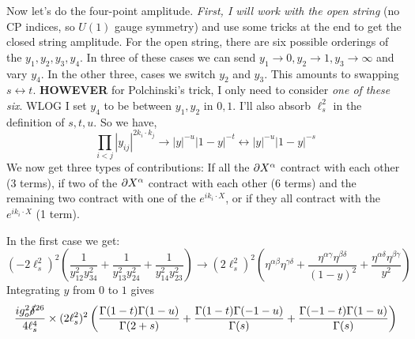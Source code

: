 \documentclass[11pt, class=article, crop=false]{standalone}
\begin{document}
\begin{enumerate}
	Now let's do the four-point amplitude. \emph{First, I will work with the open string} (no CP indices, so $U(1)$ gauge symmetry) and use some tricks at the end to get the closed string amplitude. For the open string, there are six possible orderings of the $y_1, y_2, y_3, y_4$. In three of these cases we can send $y_1\to 0, y_2 \to 1, y_3 \to \infty$ and vary $y_4$. In the other three, cases we switch $y_2$ and $y_3$. This amounts to swapping $s\leftrightarrow t$. \textbf{HOWEVER} for Polchinski's trick, I only need to consider \emph{one of these six}. WLOG I set $y_4$ to be between $y_1, y_2$ in $0,1$.
	I'll also absorb $\ell_s^2$ in the definition of $s,t,u$. So we have,
	\[
		\prod_{i<j} |y_{ij}|^{2 k_i \cdot k_j} \to |y|^{-u} |1-y|^{-t} \leftrightarrow |y|^{-u} |1-y|^{- s}
	\]
	We now get three types of contributions: If all the $\partial X^\alpha$ contract with each other (3 terms), if two of the $\partial X^\alpha$ contract with each other (6 terms) and the remaining two contract with one of the $e^{i k_i \cdot X}$, or if they all contract with the $e^{i k_i \cdot X}$ (1 term). 

	In the first case we get:
	\[
		\left(-2 \ell_s^2\right)^2 \left(\frac{1}{y_{12}^2 y_{34}^2} + \frac{1}{y_{13}^2 y_{24}^2} + \frac{1}{y_{14}^2 y_{23}^2} \right) \to \left(2 \ell_s^2\right)^2  \left(\eta^{\alpha \beta} \eta^{\gamma \delta} + \frac{\eta^{\alpha \gamma} \eta^{\beta \delta}}{(1-y)^{2}} + \frac{\eta^{\alpha \delta} \eta^{\beta \gamma}}{y^{2}} \right)  %
	\]
	Integrating $y$ from $0$ to $1$ gives
	\begin{equation}\label{eq:part1}
		\frac{i g_o^2 \cancel\delta^{26}}{4 \ell_s^4} \times (2 \ell_s^2)^2 \left(\frac{\Gamma(1-t) \Gamma(1-u)}{\Gamma(2+s)} + \frac{\Gamma(1-t) \Gamma(-1-u)}{\Gamma(s)} + \frac{\Gamma(-1-t) \Gamma(1-u)}{\Gamma(s)} \right)		
	\end{equation}

	

\end{enumerate}
\end{document}
